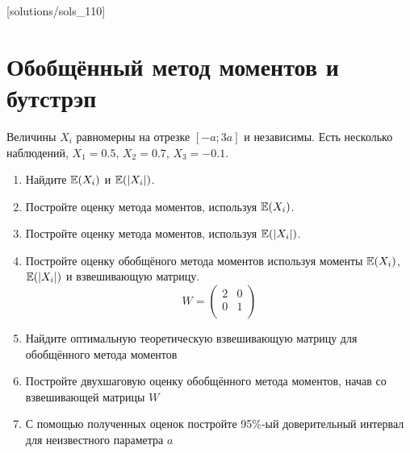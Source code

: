 [solutions/sols_110]

\chapter{Обобщённый метод моментов и бутстрэп}




\begin{problem}
Величины $X_i$ равномерны на отрезке $[-a; 3a]$ и независимы. Есть несколько наблюдений, $X_1=0.5$, $X_2=0.7$, $X_3=-0.1$.

\begin{enumerate}
\item Найдите $\mathbb{E}(X_i)$ и $\mathbb{E}(|X_i|)$.
\item Постройте оценку метода моментов, используя $\mathbb{E}(X_i)$.
\item Постройте оценку метода моментов, используя $\mathbb{E}(|X_i|)$.
\item Постройте оценку обобщёного метода моментов используя моменты $\mathbb{E}(X_i)$, $\mathbb{E}(|X_i|)$ и взвешивающую матрицу.
\[
W=\begin{pmatrix}
2 & 0 \\
0 & 1 \\
\end{pmatrix}
\]
\item Найдите оптимальную теоретическую взвешивающую матрицу для обобщённого метода моментов
\item Постройте двухшаговую оценку обобщённого метода моментов, начав со взвешивающей матрицы $W$
\item С помощью полученных оценок постройте 95\%-ый доверительный интервал для неизвестного параметра $a$

\end{enumerate}

\begin{sol}
\end{sol}
\end{problem}


